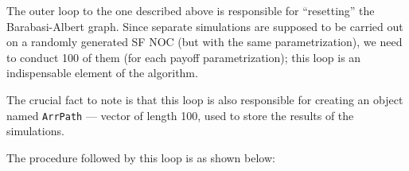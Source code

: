 \documentclass[english, twoside, 12pt, a4paper]{article}
\theoremstyle{definition}
\theoremstyle{plain}
\theoremstyle{remark}
\begin{document}
The outer loop to the one described above is responsible for \enquote{resetting} the Barabasi-Albert graph. Since separate simulations are supposed to be carried out on a randomly generated SF NOC (but with the same parametrization), we need to conduct 100 of them (for each payoff parametrization); this loop is an indispensable element of the algorithm. 

The crucial fact to note is that this loop is also responsible for creating an object named \lstinline+ArrPath+ --- vector of length 100, used to store the results of the simulations.

The procedure followed by this loop is as shown below:

\end{document}

